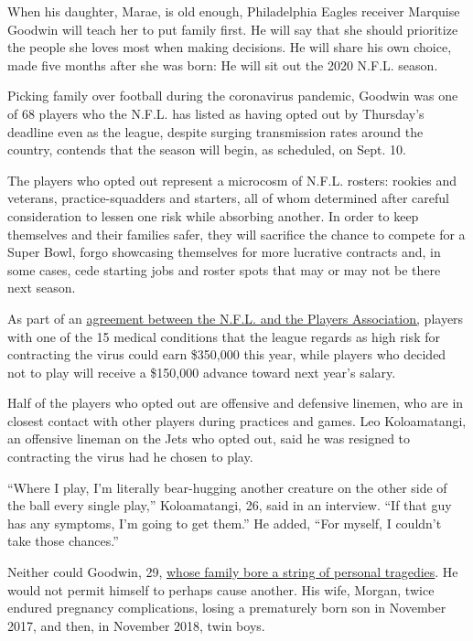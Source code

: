 When his daughter, Marae, is old enough, Philadelphia Eagles receiver
Marquise Goodwin will teach her to put family first. He will say that
she should prioritize the people she loves most when making decisions.
He will share his own choice, made five months after she was born: He
will sit out the 2020 N.F.L. season.

Picking family over football during the coronavirus pandemic, Goodwin
was one of 68 players who the N.F.L. has listed as having opted out by
Thursday's deadline even as the league, despite surging transmission
rates around the country, contends that the season will begin, as
scheduled, on Sept. 10.

The players who opted out represent a microcosm of N.F.L. rosters:
rookies and veterans, practice-squadders and starters, all of whom
determined after careful consideration to lessen one risk while
absorbing another. In order to keep themselves and their families safer,
they will sacrifice the chance to compete for a Super Bowl, forgo
showcasing themselves for more lucrative contracts and, in some cases,
cede starting jobs and roster spots that may or may not be there next
season.

As part of an
\href{https://www.nytimes.com/2020/07/24/sports/football/nfl-players-regular-season-start.html}{agreement
between the N.F.L. and the Players Association,} players with one of the
15 medical conditions that the league regards as high risk for
contracting the virus could earn \$350,000 this year, while players who
decided not to play will receive a \$150,000 advance toward next year's
salary.

Half of the players who opted out are offensive and defensive linemen,
who are in closest contact with other players during practices and
games. Leo Koloamatangi, an offensive lineman on the Jets who opted out,
said he was resigned to contracting the virus had he chosen to play.

``Where I play, I'm literally bear-hugging another creature on the other
side of the ball every single play,'' Koloamatangi, 26, said in an
interview. ``If that guy has any symptoms, I'm going to get them.'' He
added, ``For myself, I couldn't take those chances.''

Neither could Goodwin, 29,
\href{https://www.espn.com/nfl/story/_/id/29301718/philadelphia-eagles-receiver-marquise-goodwin-wife-morgan-persevere-pain-promise-family}{whose
family bore a string of personal tragedies}. He would not permit himself
to perhaps cause another. His wife, Morgan, twice endured pregnancy
complications, losing a prematurely born son in November 2017, and then,
in November 2018, twin boys.

